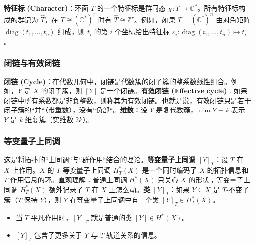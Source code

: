 \textbf{特征标 (Character)}：环面 $T$ 的一个特征标是群同态 $\chi: T \to \mathbb{C}^*$。所有特征标构成的群记为 $\hat{T}$，在 $T \cong (\mathbb{C}^*)^r$ 时有 $\hat{T} \cong \mathbb{Z}^r$。例如，如果 $T = (\mathbb{C}^*)^n$ 由对角矩阵 $\operatorname{diag}(t_1,\ldots,t_n)$ 组成，则 $t_i$ 的第 $i$ 个坐标给出特征标 $\varepsilon_i: \operatorname{diag}(t_1,\ldots,t_n) \mapsto t_i$。\subsubsection{闭链与有效闭链}\textbf{闭链 (Cycle)}：在代数几何中，闭链是代数簇的闭子簇的整系数线性组合。例如，$Y$ 是 $X$ 的闭子簇，则 $[Y]$ 是一个闭链。\textbf{有效闭链 (Effective cycle)}：如果闭链中所有系数都是非负整数，则称其为有效闭链。也就是说，有效闭链只是若干闭子簇的``并``（带重数），没有``负部``。\textbf{维数}：设 $Y$ 是复代数簇，$\dim Y = k$ 表示 $Y$ 是 $k$ 维复簇（实维数 $2k$）。\subsubsection{等变量子上同调}这是将拓扑的``上同调``与``群作用``结合的理论。\textbf{等变量子上同调 $[Y]_T$}：设 $T$ 在 $X$ 上作用。$X$ 的 $T$-等变量子上同调 $H_T^*(X)$ 是一个同时编码了 $X$ 的拓扑信息和 $T$ 作用信息的环。直观理解：普通上同调 $H^*(X)$ 只关心 $X$ 的形状；等变量子上同调 $H_T^*(X)$ 额外记录了 $T$ 在 $X$ 上怎么动。\textbf{类 $[Y]_T$}：如果 $Y \subseteq X$ 是 $T$-不变子簇（$T$ 保持 $Y$），则 $Y$ 在等变量子上同调中有一个类 $[Y]_T \in H_T^*(X)$。
\begin{itemize}
\item 当 $T$ 平凡作用时，$[Y]_T$ 就是普通的类 $[Y] \in H^*(X)$。\item $[Y]_T$ 包含了更多关于 $Y$ 与 $T$ 轨道关系的信息。
\end{itemize}

